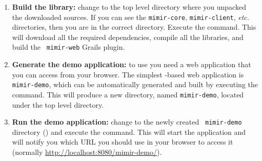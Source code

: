 \begin{enumerate}
  Alternatively, if 
  Subversion\footnote{\url{http://subversion.tigris.org/}} is installed on your
  system, you can check out the sources directly from our SourceForge repository
  by executing the following command:\\.
  The URL used in the command is for the {\tt trunk} version; adjust accordingly
  to point to one of the tags, if you require a release version instead. This
  will create a new directory called {\tt mimir} containing all the source
  files.
  \item {\bf Build the library:} change to the top level directory where you
  unpacked the downloaded \Mimir{} sources. If you can see the {\tt mimir-core},
  {\tt mimir-client}, {\em etc.} directories, then you are in the correct
  directory. Execute the  command. This will download all the
  required dependencies, compile all the \Mimir{} libraries, and build the {\tt
  mimir-web} Grails plugin.
  \item {\bf Generate the demo application:} to use \Mimir{} you need a web
  application that you can access from your browser. The simplest \Mimir{}-based
  web application is {\tt mimir-demo}, which can be automatically generated
  and built by executing the  command. This will produce a
  new directory, named {\tt mimir-demo}, located under the top level \Mimir{}
  directory.
  \item {\bf Run the demo application:}  change to the newly created {\tt
  mimir-demo} directory () and execute the  command. This will start the application and will notify you which
  URL you should use in your browser to access it (normally
  \url{http://localhost:8080/mimir-demo/}).
\end{enumerate}
%

